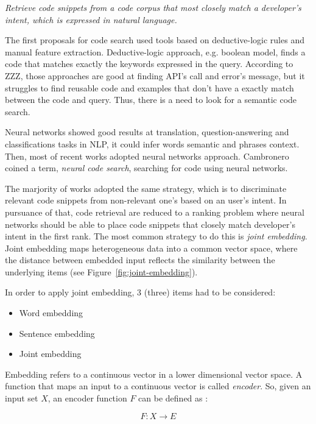 \documentclass[sigconf]{acmart}
\begin{document}
\emph{Retrieve code snippets from a code corpus that most closely match a developer's intent, which is expressed in natural language.}

The first proposals for code search used tools based on deductive-logic rules and manual feature extraction. Deductive-logic approach, e.g. boolean model, finds a code that matches exactly the keywords expressed in the query. According to ZZZ, those approaches are good at finding API's call and error's message, but it struggles to find reusable code and examples that don't have a exactly match between the code and query. Thus, there is a need to look for a semantic code search.

Neural networks showed good results at translation, question-answering and classifications tasks in NLP, it could infer words semantic and phrases context. Then, most of recent works adopted neural networks approach. Cambronero coined a term, \emph{neural code search}, searching for code using neural networks.

The marjority of works adopted the same strategy, which is to discriminate relevant code snippets from non-relevant one's based on an user's intent. In pursuance of that, code retrieval are reduced to a ranking problem where neural networks should be able to place code snippets that closely match developer's intent in the first rank. The most common strategy to do this is \emph{joint embedding}. Joint embedding maps heterogeneous data into a common vector space, where the distance between embedded input reflects the similarity between the underlying items \cite{li-joint-embedding-images-2015} (see Figure~\ref{fig:joint-embedding}).

In order to apply joint embedding, 3 (three) items had to be considered:

\begin{itemize}
    \item Word embedding
    \item Sentence embedding
    \item Joint embedding
\end{itemize}

Embedding refers to a continuous vector in a lower dimensional vector space. A function that maps an input to a continuous vector is called \emph{encoder}. So, given an input set $X$, an encoder function $F$ can be defined as \cite{cambronero-deep-code-search-2019}:

\begin{equation}
    F: X \to E
\end{equation}
\end{document}
